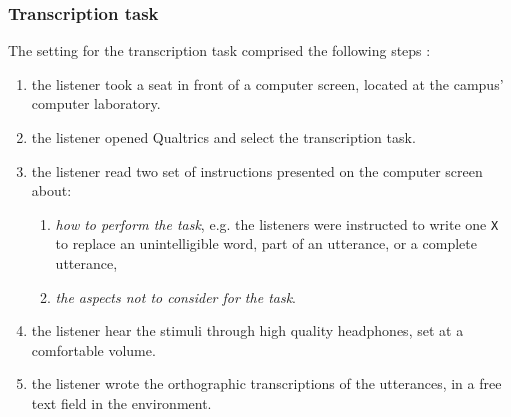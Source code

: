 \subsubsection{Transcription task} \label{ssSA:transcription}
%
The setting for the transcription task comprised the following steps \citep{Boonen_et_al_2020, Boonen_et_al_2021}:
%
\begin{enumerate} %
	\item the listener took a seat in front of a computer screen, located at the campus' computer laboratory.
	\item the listener opened Qualtrics \cite{Qualtrics_2005} and select the transcription task.
	\item the listener read two set of instructions presented on the computer screen about:
	\begin{enumerate}
		\item \textit{how to perform the task}, e.g. the listeners were instructed to write one \texttt{X} to replace an unintelligible word, part of an utterance, or a complete utterance,
		\item \textit{the aspects not to consider for the task}.
	\end{enumerate}
	\item the listener hear the stimuli through high quality headphones, set at a comfortable volume.
	\item the listener wrote the orthographic transcriptions of the utterances, in a free text field in the environment. 
\end{enumerate}
%
%
